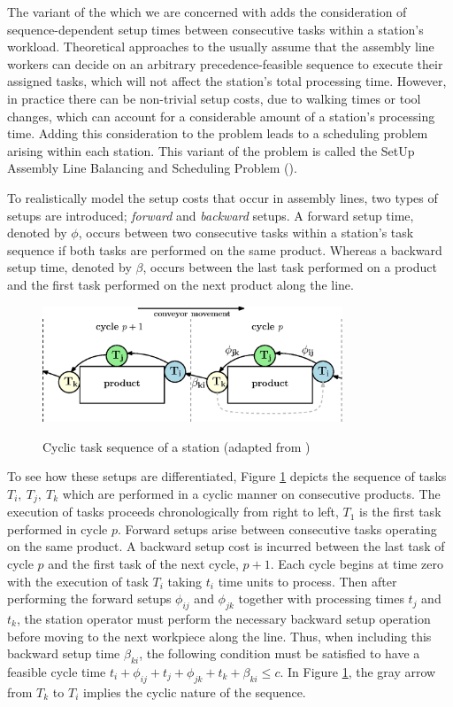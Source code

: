 The variant of the \albp{} which we are concerned with adds the consideration
of sequence-dependent setup times between consecutive tasks
within a station's workload.
Theoretical approaches to the \albp{} usually assume that the assembly
line workers can decide on an arbitrary precedence-feasible sequence
to execute their assigned tasks, which will not affect the station's total
processing time.
However, in practice there can be non-trivial setup costs, due
to walking times or tool changes, which can account for a considerable amount
of a station's processing time.
Adding this consideration to the problem
leads to a scheduling problem arising within each station.
This variant of the problem is called the SetUp Assembly Line Balancing and
Scheduling Problem (\sua{}).

To realistically model the setup costs that occur
in assembly lines, two types of setups are introduced;
\emph{forward} and \emph{backward} setups.
A forward setup time, denoted by $\phi$, occurs between two consecutive
tasks within a station's task sequence if both tasks
are performed on the same product.
Whereas a backward setup time, denoted by $\beta$, occurs between the last task
performed on a product and the first task performed on
the next product along the line.

\begin{figure}[tpb]
	\centering
	\caption{Cyclic task sequence of a station (adapted from \cite{Scholl2013})}
	\vspace{2mm}
	\includegraphics[width=0.8\textwidth]{images/IntroForwBackSetupEx.eps}
	\label{fig:intro:forwBackDifference}
\end{figure}

To see how these setups are differentiated, 
Figure \ref{fig:intro:forwBackDifference} depicts the sequence of tasks 
$T_i,\:T_j,\:T_k$ which are performed in a cyclic manner on consecutive
products.
The execution of tasks proceeds chronologically from right to left,
\ie $T_1$ is the first task performed in cycle $p$.
Forward setups arise between consecutive tasks operating
on the same product.
A backward setup cost is incurred between the last
task of cycle $p$ and the first task of the next cycle, $p+1$.
Each cycle begins at time zero with the execution of task $T_i$
taking $t_i$ time units to process.
Then after performing the forward setups $\phi_{ij}$ and $\phi_{jk}$
together with processing times $t_j$ and $t_k$,
the station operator must perform the necessary backward
setup operation before moving to the next
workpiece along the line. 
Thus, when including this backward setup time $\beta_{ki}$,
the following condition must be satisfied to have a 
feasible cycle time
$t_i+\phi_{ij}+t_j+\phi_{jk}+t_k+\beta_{ki} \leq c$.
In Figure \ref{fig:intro:forwBackDifference}, the gray arrow  from $T_k$ to $T_i$ implies
the cyclic nature of the sequence.

